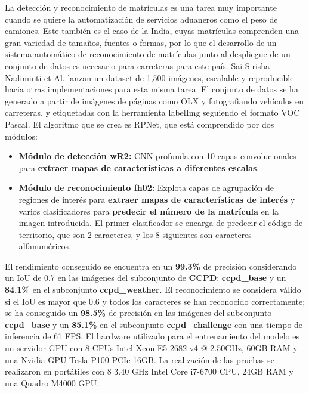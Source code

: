 \documentclass[11pt]{article}
\begin{document}
La detección y reconocimiento de matrículas es una tarea muy importante cuando se quiere la automatización de servicios aduaneros como el peso de camiones. Este también es el caso de la India, cuyas matrículas comprenden una gran variedad de tamaños, fuentes o formas, por lo que el desarrollo de un sistema automático de reconocimiento de matrículas junto al despliegue de un conjunto de datos es necesario para carreteras para este país. Sai Sirisha Nadiminti et Al.\cite{nadiminti2022explorationendtoendautomaticnumberplate} lanzan un dataset de 1,500 imágenes, escalable y reproducible hacia otras implementaciones para esta misma tarea. El conjunto de datos se ha generado a partir de imágenes de páginas como OLX y fotografiando vehículos en carreteras, y etiquetadas con la herramienta labelImg seguiendo el formato VOC Pascal. El algoritmo que se crea es RPNet, que está comprendido por dos módulos:
\begin{itemize}
    \item \textbf{Módulo de detección wR2:} CNN profunda con 10 capas convolucionales para \textbf{extraer mapas de características a diferentes escalas}.
    \item \textbf{Módulo de reconocimiento fh02:} Explota capas de agrupación de regiones de interés para \textbf{extraer mapas de características de interés} y varios clasificadores para \textbf{predecir el número de la matrícula} en la imagen introducida. El primer clasificador se encarga de predecir el código de territorio, que son 2 caracteres, y los 8 siguientes son caracteres alfanuméricos.
\end{itemize}

El rendimiento conseguido se encuentra en un \textbf{99.3\%} de precisión considerando un IoU de 0.7 en las imágenes del subconjunto de \textbf{CCPD}: \textbf{ccpd\_base} y un \textbf{84.1\%} en el subconjunto \textbf{ccpd\_weather}. El reconocimiento se considera válido si el IoU es mayor que 0.6 y todos los caracteres se han reconocido correctamente; se ha conseguido un \textbf{98.5\%} de precisión en las imágenes del subconjunto \textbf{ccpd\_base} y un \textbf{85.1\%} en el subconjunto \textbf{ccpd\_challenge} con una tiempo de inferencia de 61 FPS. El hardware utilizado para el entrenamiento del modelo es un servidor GPU con 8 CPUs Intel Xeon E5-2682 v4 @ 2.50GHz, 60GB RAM y una Nvidia GPU Tesla P100 PCIe 16GB. La realización de las pruebas se realizaron en portátiles con 8 3.40 GHz Intel Core i7-6700 CPU, 24GB RAM y una Quadro M4000 GPU. 
\end{document}
